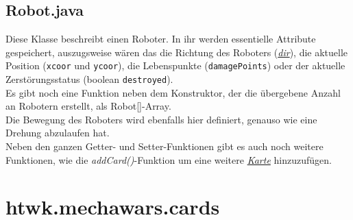 \documentclass[12pt,a4paper,oneside]{book}
\theoremstyle{plain}
\numberwithin{equation}{chapter} \DeclareMathOperator{\Var}{Var}
\begin{document}
\subsection{Robot.java}
    Diese Klasse beschreibt einen Roboter. In ihr werden essentielle Attribute gespeichert, auszugsweise wären das die Richtung des Roboters (\hyperlink{Dir.java}{\textit{dir}}), die aktuelle Position (\texttt{xcoor} und \texttt{ycoor}), die Lebenspunkte (\texttt{damagePoints}) oder der aktuelle Zerstörungsstatus (boolean \texttt{destroyed}). \\
    Es gibt noch eine Funktion neben dem Konstruktor, der die übergebene Anzahl an Robotern erstellt, als Robot[]-Array. \\
    Die Bewegung des Roboters wird ebenfalls hier definiert, genauso wie eine Drehung abzulaufen hat. \\
    Neben den ganzen Getter- und Setter-Funktionen gibt es auch noch weitere Funktionen, wie die \textit{addCard()}-Funktion um eine weitere \hyperlink{Card.java}{\textit{Karte}} hinzuzufügen.

\newpage
\section{htwk.mechawars.cards}
\hypertarget{Card.java}{}
\end{document}
